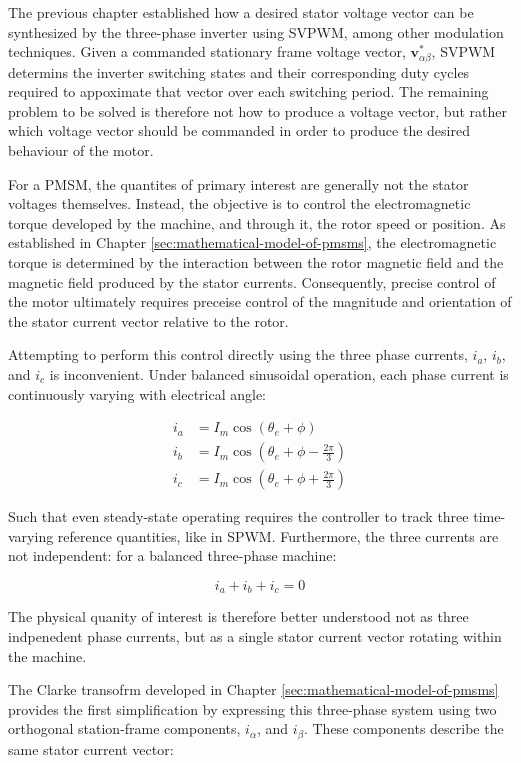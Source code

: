 \documentclass{article}
\begin{document}
The previous chapter established how a desired stator voltage vector can be synthesized by the three-phase inverter using SVPWM, among other modulation techniques. Given a commanded stationary frame voltage vector, $\mathbf{v}_{\alpha\beta}^*$, SVPWM determins the inverter switching states and their corresponding duty cycles required to appoximate that vector over each switching period. The remaining problem to be solved is therefore not how to produce a voltage vector, but rather which voltage vector should be commanded in order to produce the desired behaviour of the motor.

For a PMSM, the quantites of primary interest are generally not the stator voltages themselves. Instead, the objective is to control the electromagnetic torque developed by the machine, and through it, the rotor speed or position. As established in Chapter \ref{sec:mathematical-model-of-pmsms}, the electromagnetic torque is determined by the interaction between the rotor magnetic field and the magnetic field produced by the stator currents. Consequently, precise control of the motor ultimately requires preceise control of the magnitude and orientation of the stator current vector relative to the rotor.

Attempting to perform this control directly using the three phase currents, $i_a$, $i_b$, and $i_c$ is inconvenient. Under balanced sinusoidal operation, each phase current is continuously varying with electrical angle:

\begin{align}
    i_a &= I_m\cos(\theta_e + \phi) \\
    i_b &= I_m\cos(\theta_e + \phi - \frac{2\pi}{3}) \\
    i_c &= I_m\cos(\theta_e + \phi + \frac{2\pi}{3})
\end{align}

Such that even steady-state operating requires the controller to track three time-varying reference quantities, like in SPWM. Furthermore, the three currents are not independent: for a balanced three-phase machine:

\begin{equation}
    i_a + i_b + i_c = 0
\end{equation}

The physical quanity of interest is therefore better understood not as three indpenedent phase currents, but as a single stator current vector rotating within the machine.

The Clarke transofrm developed in Chapter \ref{sec:mathematical-model-of-pmsms} provides the first simplification by expressing this three-phase system using two orthogonal station-frame components, $i_\alpha$, and $i_\beta$. These components describe the same stator current vector:
\end{document}

